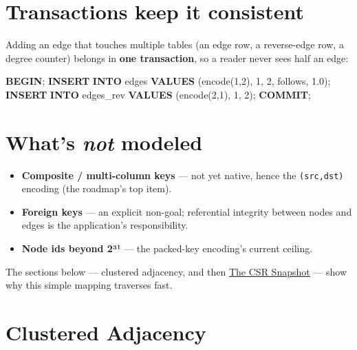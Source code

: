 \documentclass[
  11pt,
  openany]{book}
\newenvironment{Shaded}{}{}
\newcommand{\ControlFlowTok}[1]{\textcolor[rgb]{0.00,0.44,0.13}{\textbf{#1}}}
\newcommand{\DecValTok}[1]{\textcolor[rgb]{0.25,0.63,0.44}{#1}}
\newcommand{\FloatTok}[1]{\textcolor[rgb]{0.25,0.63,0.44}{#1}}
\newcommand{\KeywordTok}[1]{\textcolor[rgb]{0.00,0.44,0.13}{\textbf{#1}}}
\newcommand{\NormalTok}[1]{#1}
\newcommand{\StringTok}[1]{\textcolor[rgb]{0.25,0.44,0.63}{#1}}
\providecommand{\tightlist}{%
  \setlength{\itemsep}{0pt}\setlength{\parskip}{0pt}}
\begin{document}
\section{Transactions keep it
consistent}\label{transactions-keep-it-consistent}

Adding an edge that touches multiple tables (an edge row, a reverse-edge
row, a degree counter) belongs in \textbf{one transaction}, so a reader
never sees half an edge:

\begin{Shaded}
\begin{Highlighting}[]
\ControlFlowTok{BEGIN}\NormalTok{;}
  \KeywordTok{INSERT} \KeywordTok{INTO}\NormalTok{ edges }\KeywordTok{VALUES}\NormalTok{ (encode(}\DecValTok{1}\NormalTok{,}\DecValTok{2}\NormalTok{), }\DecValTok{1}\NormalTok{, }\DecValTok{2}\NormalTok{, }\StringTok{\textquotesingle{}follows\textquotesingle{}}\NormalTok{, }\FloatTok{1.0}\NormalTok{);}
  \KeywordTok{INSERT} \KeywordTok{INTO}\NormalTok{ edges\_rev }\KeywordTok{VALUES}\NormalTok{ (encode(}\DecValTok{2}\NormalTok{,}\DecValTok{1}\NormalTok{), }\DecValTok{1}\NormalTok{, }\DecValTok{2}\NormalTok{);}
\KeywordTok{COMMIT}\NormalTok{;}
\end{Highlighting}
\end{Shaded}

\section{\texorpdfstring{What's \emph{not}
modeled}{What's not modeled}}\label{whats-not-modeled}

\begin{itemize}
\tightlist
\item
  \textbf{Composite / multi-column keys} --- not yet native, hence the
  \texttt{(src,dst)} encoding (the roadmap's top item).
\item
  \textbf{Foreign keys} --- an explicit non-goal; referential integrity
  between nodes and edges is the application's responsibility.
\item
  \textbf{Node ids beyond 2³¹} --- the packed-key encoding's current
  ceiling.
\end{itemize}

The sections below --- clustered adjacency, and then
\href{snapshot.md}{The CSR Snapshot} --- show why this simple mapping
traverses fast.

\section{Clustered Adjacency}\label{clustered-adjacency}
\end{document}
